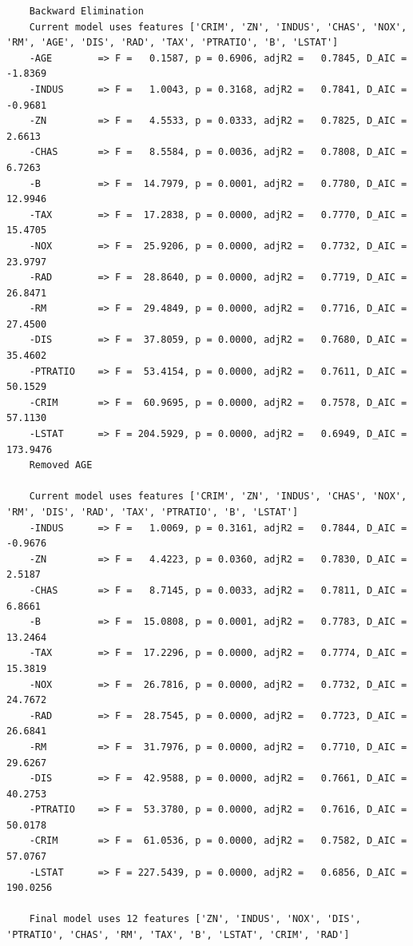 \documentclass[10pt]{article}
\begin{document}
    \lstset{basicstyle=\ttfamily\footnotesize,breaklines=true}
    \begin{lstlisting}
    Backward Elimination
    Current model uses features ['CRIM', 'ZN', 'INDUS', 'CHAS', 'NOX', 'RM', 'AGE', 'DIS', 'RAD', 'TAX', 'PTRATIO', 'B', 'LSTAT']
    -AGE        => F =   0.1587, p = 0.6906, adjR2 =   0.7845, D_AIC =  -1.8369
    -INDUS      => F =   1.0043, p = 0.3168, adjR2 =   0.7841, D_AIC =  -0.9681
    -ZN         => F =   4.5533, p = 0.0333, adjR2 =   0.7825, D_AIC =   2.6613
    -CHAS       => F =   8.5584, p = 0.0036, adjR2 =   0.7808, D_AIC =   6.7263
    -B          => F =  14.7979, p = 0.0001, adjR2 =   0.7780, D_AIC =  12.9946
    -TAX        => F =  17.2838, p = 0.0000, adjR2 =   0.7770, D_AIC =  15.4705
    -NOX        => F =  25.9206, p = 0.0000, adjR2 =   0.7732, D_AIC =  23.9797
    -RAD        => F =  28.8640, p = 0.0000, adjR2 =   0.7719, D_AIC =  26.8471
    -RM         => F =  29.4849, p = 0.0000, adjR2 =   0.7716, D_AIC =  27.4500
    -DIS        => F =  37.8059, p = 0.0000, adjR2 =   0.7680, D_AIC =  35.4602
    -PTRATIO    => F =  53.4154, p = 0.0000, adjR2 =   0.7611, D_AIC =  50.1529
    -CRIM       => F =  60.9695, p = 0.0000, adjR2 =   0.7578, D_AIC =  57.1130
    -LSTAT      => F = 204.5929, p = 0.0000, adjR2 =   0.6949, D_AIC = 173.9476
    Removed AGE       

    Current model uses features ['CRIM', 'ZN', 'INDUS', 'CHAS', 'NOX', 'RM', 'DIS', 'RAD', 'TAX', 'PTRATIO', 'B', 'LSTAT']
    -INDUS      => F =   1.0069, p = 0.3161, adjR2 =   0.7844, D_AIC =  -0.9676
    -ZN         => F =   4.4223, p = 0.0360, adjR2 =   0.7830, D_AIC =   2.5187
    -CHAS       => F =   8.7145, p = 0.0033, adjR2 =   0.7811, D_AIC =   6.8661
    -B          => F =  15.0808, p = 0.0001, adjR2 =   0.7783, D_AIC =  13.2464
    -TAX        => F =  17.2296, p = 0.0000, adjR2 =   0.7774, D_AIC =  15.3819
    -NOX        => F =  26.7816, p = 0.0000, adjR2 =   0.7732, D_AIC =  24.7672
    -RAD        => F =  28.7545, p = 0.0000, adjR2 =   0.7723, D_AIC =  26.6841
    -RM         => F =  31.7976, p = 0.0000, adjR2 =   0.7710, D_AIC =  29.6267
    -DIS        => F =  42.9588, p = 0.0000, adjR2 =   0.7661, D_AIC =  40.2753
    -PTRATIO    => F =  53.3780, p = 0.0000, adjR2 =   0.7616, D_AIC =  50.0178
    -CRIM       => F =  61.0536, p = 0.0000, adjR2 =   0.7582, D_AIC =  57.0767
    -LSTAT      => F = 227.5439, p = 0.0000, adjR2 =   0.6856, D_AIC = 190.0256

    Final model uses 12 features ['ZN', 'INDUS', 'NOX', 'DIS', 'PTRATIO', 'CHAS', 'RM', 'TAX', 'B', 'LSTAT', 'CRIM', 'RAD']
    \end{lstlisting}
\end{document}
